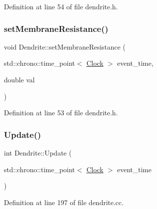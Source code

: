 Definition at line 54 of file dendrite.\+h.

\mbox{\label{class_dendrite_af6141643bf2c85404ae9c320611d1d31}} 
\subsubsection{\texorpdfstring{set\+Membrane\+Resistance()}{setMembraneResistance()}}
{\footnotesize\ttfamily void Dendrite\+::set\+Membrane\+Resistance (\begin{DoxyParamCaption}\item[{std\+::chrono\+::time\+\_\+point$<$ \hyperlink{universe_8h_a0ef8d951d1ca5ab3cfaf7ab4c7a6fd80}{Clock} $>$}]{event\+\_\+time,  }\item[{double}]{val }\end{DoxyParamCaption})\hspace{0.3cm}{\ttfamily [inline]}}



Definition at line 53 of file dendrite.\+h.

\mbox{\label{class_dendrite_a2e7bfde37bc7aec2547253ad038aaa04}} 
\subsubsection{\texorpdfstring{Update()}{Update()}}
{\footnotesize\ttfamily int Dendrite\+::\+Update (\begin{DoxyParamCaption}\item[{std\+::chrono\+::time\+\_\+point$<$ \hyperlink{universe_8h_a0ef8d951d1ca5ab3cfaf7ab4c7a6fd80}{Clock} $>$}]{event\+\_\+time }\end{DoxyParamCaption})}



Definition at line 197 of file dendrite.\+cc.

